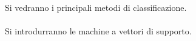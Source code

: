 {\bfseries
\vspace{1in}

\paragraph{}
Si vedranno i principali metodi di classificazione.


\paragraph{}
Si introdurranno le machine a vettori di supporto.




\vfill
}